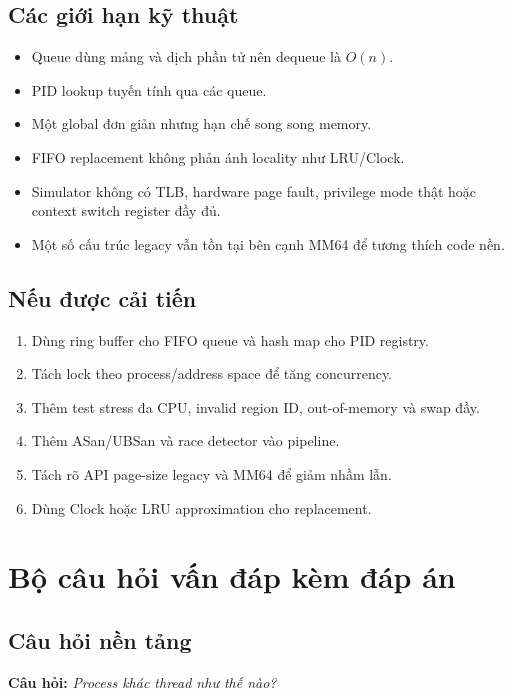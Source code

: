 \documentclass[12pt,a4paper]{article}
\newcommand{\code}[1]{\texttt{\detokenize{#1}}}
\newcommand{\question}[1]{\textbf{\color{bkgold}Câu hỏi:} \textit{#1}}
\begin{document}
\subsection{Các giới hạn kỹ thuật}

\begin{itemize}
  \item Queue dùng mảng và dịch phần tử nên dequeue là \(O(n)\).
  \item PID lookup tuyến tính qua các queue.
  \item Một global \code{mmvm_lock} đơn giản nhưng hạn chế song song memory.
  \item FIFO replacement không phản ánh locality như LRU/Clock.
  \item Simulator không có TLB, hardware page fault, privilege mode thật hoặc
  context switch register đầy đủ.
  \item Một số cấu trúc legacy vẫn tồn tại bên cạnh MM64 để tương thích code
  nền.
\end{itemize}

\subsection{Nếu được cải tiến}

\begin{enumerate}
  \item Dùng ring buffer cho FIFO queue và hash map cho PID registry.
  \item Tách lock theo process/address space để tăng concurrency.
  \item Thêm test stress đa CPU, invalid region ID, out-of-memory và swap đầy.
  \item Thêm ASan/UBSan và race detector vào pipeline.
  \item Tách rõ API page-size legacy và MM64 để giảm nhầm lẫn.
  \item Dùng Clock hoặc LRU approximation cho replacement.
\end{enumerate}

\section{Bộ câu hỏi vấn đáp kèm đáp án}

\subsection{Câu hỏi nền tảng}

\question{Process khác thread như thế nào?}
\end{document}
